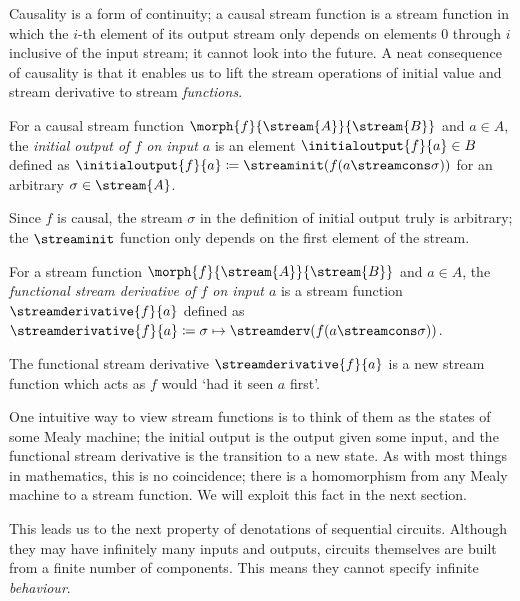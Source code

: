 \documentclass{lmcs}
\begin{document}
Causality is a form of continuity; a causal stream function is a stream function
in which the \(i\)-th element of its output stream only depends on elements
\(0\) through \(i\) inclusive of the input stream; it cannot look into the
future.
A neat consequence of causality is that it enables us to lift the stream
operations of initial value and stream derivative to stream \emph{functions}.

\begin{defi}
    For a causal stream function \(\morph{f}{\stream{A}}{\stream{B}}\) and
    \(a \in A\), the \emph{initial output of \(f\) on input \(a\)} is an element
    \(\initialoutput{f}{a} \in B\) defined as
    \(\initialoutput{f}{a} \coloneqq \streaminit(f(a \streamcons \sigma))\) for
    an arbitrary \(\sigma \in \stream{A}\).
\end{defi}

Since \(f\) is causal, the stream \(\sigma\) in the definition of initial
output truly is arbitrary; the \(\streaminit\) function only depends on the
first element of the stream.

\begin{defi}
    For a stream function \(\morph{f}{\stream{A}}{\stream{B}}\) and
    \(a \in A\), the
    \emph{functional stream derivative of \(f\) on input \(a\)} is a stream
    function \(\streamderivative{f}{a}\) defined as \(
    \streamderivative{f}{a}
    \coloneqq
    \sigma \mapsto \streamderv(f(a \streamcons \sigma))
    \).
\end{defi}

The functional stream derivative \(\streamderivative{f}{a}\) is a new stream
function which acts as \(f\) would `had it seen \(a\) first'.

\begin{rem}
    One intuitive way to view stream functions is to think of them as the states
    of some Mealy machine; the initial output is the output given some input,
    and the functional stream derivative is the transition to a new state.
    As with most things in mathematics, this is no coincidence; there is a
    homomorphism from any Mealy machine to a stream function.
    We will exploit this fact in the next section.
\end{rem}

This leads us to the next property of denotations of sequential circuits.
Although they may have infinitely many inputs and outputs, circuits themselves
are built from a finite number of components.
This means they cannot specify infinite \emph{behaviour}.
\end{document}
